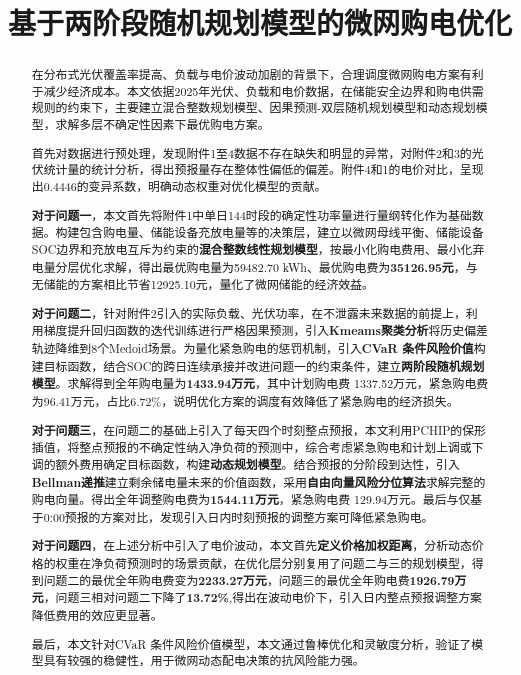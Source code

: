 \documentclass{cumcm2026}
\title{基于两阶段随机规划模型的微网购电优化}
\begin{document}
\maketitle
\begin{abstract}

在分布式光伏覆盖率提高、负载与电价波动加剧的背景下，合理调度微网购电方案有利于减少经济成本。本文依据2025年光伏、负载和电价数据，在储能安全边界和购电供需规则的约束下，主要建立混合整数规划模型、因果预测-双层随机规划模型和动态规划模型，求解多层不确定性因素下最优购电方案。

首先对数据进行预处理，发现附件1至4数据不存在缺失和明显的异常，对附件2和3的光伏统计量的统计分析，得出预报量存在整体性偏低的偏差。附件4和1的电价对比，呈现出0.4446的变异系数，明确动态权重对优化模型的贡献。


\textbf{对于问题一}，本文首先将附件1中单日144时段的确定性功率量进行量纲转化作为基础数据。构建包含购电量、储能设备充放电量等的决策层，建立以微网母线平衡、储能设备SOC边界和充放电互斥为约束的\textbf{混合整数线性规划模型}，按最小化购电费用、最小化弃电量分层优化求解，得出最优购电量为59482.70 kWh、最优购电费为\textbf{35126.95元}，与无储能的方案相比节省12925.10元，量化了微网储能的经济效益。

\textbf{对于问题二}，针对附件2引入的实际负载、光伏功率，在不泄露未来数据的前提上，利用梯度提升回归函数的迭代训练进行严格因果预测，引入\textbf{Kmeams聚类分析}将历史偏差轨迹降维到8个Medoid场景。为量化紧急购电的惩罚机制，引入\textbf{CVaR 条件风险价值}构建目标函数，结合SOC的跨日连续承接并改进问题一的约束条件，建立\textbf{两阶段随机规划模型}。求解得到全年购电量为\textbf{1433.94万元}，其中计划购电费 1337.52万元，紧急购电费为96.41万元，占比6.72\%，说明优化方案的调度有效降低了紧急购电的经济损失。

\textbf{对于问题三}，在问题二的基础上引入了每天四个时刻整点预报，本文利用PCHIP的保形插值，将整点预报的不确定性纳入净负荷的预测中，综合考虑紧急购电和计划上调或下调的额外费用确定目标函数，构建\textbf{动态规划模型}。结合预报的分阶段到达性，引入\textbf{Bellman递推}建立剩余储电量未来的价值函数，采用\textbf{自由向量风险分位算法}求解完整的购电向量。得出全年调整购电费为\textbf{1544.11万元}，紧急购电费 129.94万元。最后与仅基于0:00预报的方案对比，发现引入日内时刻预报的调整方案可降低紧急购电。

\textbf{对于问题四}，在上述分析中引入了电价波动，本文首先\textbf{定义价格加权距离}，分析动态价格的权重在净负荷预测时的场景贡献，在优化层分别复用了问题二与三的规划模型，得到问题二的最优全年购电费变为\textbf{2233.27万元}，问题三的最优全年购电费\textbf{1926.79万元}，问题三相对问题二下降了\textbf{13.72\%},得出在波动电价下，引入日内整点预报调整方案降低费用的效应更显著。 

最后，本文针对CVaR 条件风险价值模型，本文通过鲁棒优化和灵敏度分析，验证了模型具有较强的稳健性，用于微网动态配电决策的抗风险能力强。



\end{abstract}
\end{document}
